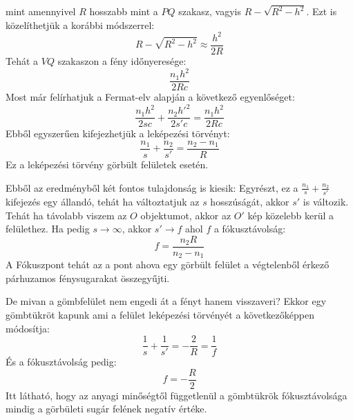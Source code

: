 \documentclass[../main.tex]{subfiles}
\begin{document}
mint amennyivel $R$ hosszabb mint a $PQ$ szakasz, vagyis $R - \sqrt{R^2 - h^2}$. Ezt is közelíthetjük a korábbi módszerrel:
\begin{equation}
    R - \sqrt{R^2 - h^2} \approx \frac{h^2}{2R}
\end{equation}
Tehát a $VQ$ szakaszon a fény időnyeresége:
\begin{equation}
    \frac{n_1 h^2}{2R c}
\end{equation}
Most már felírhatjuk a Fermat-elv alapján a következő egyenlőséget:
\begin{equation}
    \frac{n_1 h^2}{2s c} + \frac{n_2 h'^2}{2s' c} = \frac{n_1 h^2}{2R c}
\end{equation}
Ebből egyszerűen kifejezhetjük a leképezési törvényt:
\begin{equation}
    \boxed{\frac{n_1}{s} + \frac{n_2}{s'} = \frac{n_2 - n_1}{R}}
\end{equation}
Ez a leképezési törvény görbült felületek esetén. 

Ebből az eredményből két fontos tulajdonság is kiesik: Egyrészt, ez a $\frac{n_1}{s} + \frac{n_2}{s'}$ kifejezés egy állandó, tehát ha változtatjuk az $s$ hosszúságát, akkor $s'$ is változik.
Tehát ha távolabb viszem az $O$ objektumot, akkor az $O'$ kép közelebb kerül a felülethez. Ha pedig $s \to \infty$, akkor $s' \to f$ ahol $f$ a fókusztávolság:
\begin{equation}
    \boxed{f = \frac{n_2 R}{n_2 - n_1}}
\end{equation}
A Fókuszpont tehát az a pont ahova egy görbült felület a végtelenből érkező párhuzamos fénysugarakat összegyűjti.

De mivan a gömbfelület nem engedi át a fényt hanem visszaveri? Ekkor egy gömbtükröt kapunk ami a felület leképezési törvényét a következőképpen módosítja:
\begin{equation}
    \boxed{\frac{1}{s} + \frac{1}{s'} = - \frac{2}{R} = \frac{1}{f}}
\end{equation}
És a fókusztávolság pedig:
\begin{equation}
    \boxed{f = - \frac{R}{2}}
\end{equation}
Itt látható, hogy az anyagi minőségtől függetlenül a gömbtükrök fókusztávolsága mindig a görbületi sugár felének negatív értéke.
\end{document}
